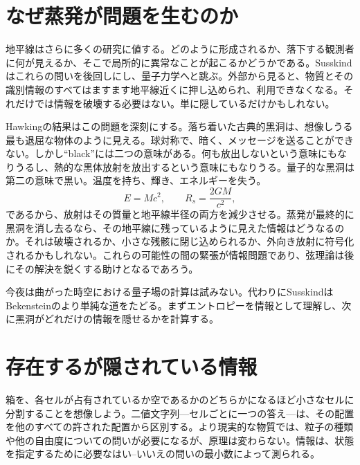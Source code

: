 \begin{classroomqa}
\end{classroomqa}

\section{なぜ蒸発が問題を生むのか}

地平線はさらに多くの研究に値する。どのように形成されるか、落下する観測者に何が見えるか、そこで局所的に異常なことが起こるかどうかである。Susskindはこれらの問いを後回しにし、量子力学へと跳ぶ。外部から見ると、物質とその識別情報のすべてはますます地平線近くに押し込められ、利用できなくなる。それだけでは情報を破壊する必要はない。単に隠しているだけかもしれない。

Hawkingの結果はこの問題を深刻にする。落ち着いた古典的黑洞は、想像しうる最も退屈な物体のように見える。球対称で、暗く、メッセージを送ることができない。しかし``black''には二つの意味がある。何も放出しないという意味にもなりうるし、熱的な黒体放射を放出するという意味にもなりうる。量子的な黑洞は第二の意味で黒い。温度を持ち、輝き、エネルギーを失う。
\begin{equation}
E=Mc^2,
\qquad
R_s=\frac{2GM}{c^2},
\end{equation}
であるから、放射はその質量と地平線半径の両方を減少させる。蒸発が最終的に黑洞を消し去るなら、その地平線に残っているように見えた情報はどうなるのか。それは破壊されるか、小さな残骸に閉じ込められるか、外向き放射に符号化されるかもしれない。これらの可能性の間の緊張が情報問題であり、弦理論は後にその解決を鋭くする助けとなるであろう。

今夜は曲がった時空における量子場の計算は試みない。代わりにSusskindはBekensteinのより単純な道をたどる。まずエントロピーを情報として理解し、次に黑洞がどれだけの情報を隠せるかを計算する。

\section{存在するが隠されている情報}

箱を、各セルが占有されているか空であるかのどちらかになるほど小さなセルに分割することを想像しよう。二値文字列---セルごとに一つの答え---は、その配置を他のすべての許された配置から区別する。より現実的な物質では、粒子の種類や他の自由度についての問いが必要になるが、原理は変わらない。情報は、状態を指定するために必要なはい--いいえの問いの最小数によって測られる。

